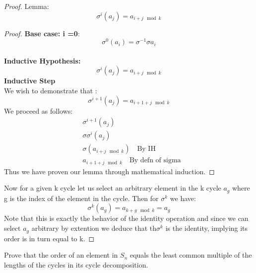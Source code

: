 \documentclass[11pt]{article}
\theoremstyle{definition}  %
\newcommand{\block}[2]{\begin{tcolorbox}[title={#1}]{#2}\end{tcolorbox}}
\begin{document}
\begin{proof}
Lemma:
\[
  \sigma^i(a_j)=a_{i+j\mod k}
\]
\begin{proof}
  \textbf{Base case: i =0}: \\
    $$\sigma^0(a_i)=\sigma^{-1}\sigma a_{i}$$
    \\
    \textbf{Inductive Hypothesis:}\\
    \[
      \sigma^i(a_j)=a_{i+j\mod k}
    \]
    \textbf{Inductive Step }\\
    We wish to demonstrate that :
    \[
      \sigma^{i+1}(a_j)=a_{i+1+j\mod k}
    \]
    We proceed as follows:
    \begin{align*}
      &\sigma^{i+1}(a_j)\\
      &\sigma\sigma^i(a_j)\\
      &\sigma(a_{i+j\mod k})\quad \text{By IH}\\
      &a_{i+1+j\mod k}\quad \text{By defn of sigma}
    \end{align*}
    Thus we have proven our lemma through mathematical induction.
\end{proof}
Now for a given k cycle let us select an arbitrary element in the k cycle $a_g$ where g is the index of the element in the cycle. Then for $\sigma^k$ we have:
\[
  \sigma^k(a_g)=a_{k+g\mod k }=a_g
\]
Note that this is exactly the behavior of the identity operation and since we can select $a_g$ arbitrary by extention we deduce that th$\sigma^k$ is the identity, implying its order is in turn equal to k.
\end{proof}
\block{Question #3}{
Prove that the order of an element in $S_n$ equals the least common multiple of the lengths of the cycles in its cycle decomposition.
}
\end{document}

